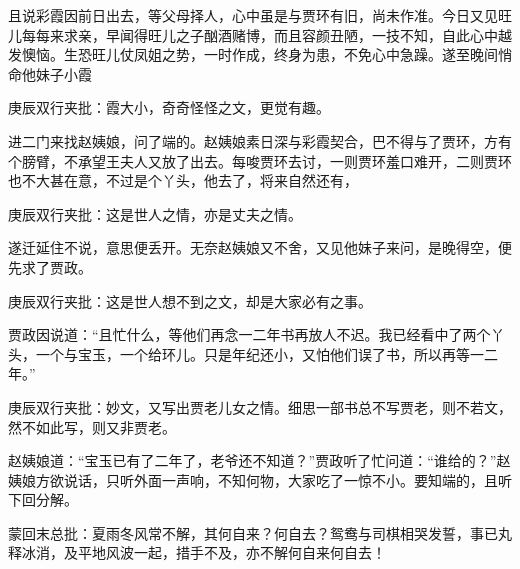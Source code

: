 \begin{parag}
    且说彩霞因前日出去，等父母择人，心中虽是与贾环有旧，尚未作准。今日又见旺儿每每来求亲，早闻得旺儿之子酗酒赌博，而且容颜丑陋，一技不知，自此心中越发懊恼。生恐旺儿仗凤姐之势，一时作成，终身为患，不免心中急躁。遂至晚间悄命他妹子小霞\begin{note}庚辰双行夹批：霞大小，奇奇怪怪之文，更觉有趣。\end{note}进二门来找赵姨娘，问了端的。赵姨娘素日深与彩霞契合，巴不得与了贾环，方有个膀臂，不承望王夫人又放了出去。每唆贾环去讨，一则贾环羞口难开，二则贾环也不大甚在意，不过是个丫头，他去了，将来自然还有，\begin{note}庚辰双行夹批：这是世人之情，亦是丈夫之情。\end{note}遂迁延住不说，意思便丢开。无奈赵姨娘又不舍，又见他妹子来问，是晚得空，便先求了贾政。\begin{note}庚辰双行夹批：这是世人想不到之文，却是大家必有之事。\end{note}贾政因说道：“且忙什么，等他们再念一二年书再放人不迟。我已经看中了两个丫头，一个与宝玉，一个给环儿。只是年纪还小，又怕他们误了书，所以再等一二年。”\begin{note}庚辰双行夹批：妙文，又写出贾老儿女之情。细思一部书总不写贾老，则不若文，然不如此写，则又非贾老。\end{note}赵姨娘道：“宝玉已有了二年了，老爷还不知道？”贾政听了忙问道：“谁给的？”赵姨娘方欲说话，只听外面一声响，不知何物，大家吃了一惊不小。要知端的，且听下回分解。
\end{parag}


\begin{parag}
    \begin{note}蒙回末总批：夏雨冬风常不解，其何自来？何自去？鸳鸯与司棋相哭发誓，事已丸释冰消，及平地风波一起，措手不及，亦不解何自来何自去！\end{note}
\end{parag}
